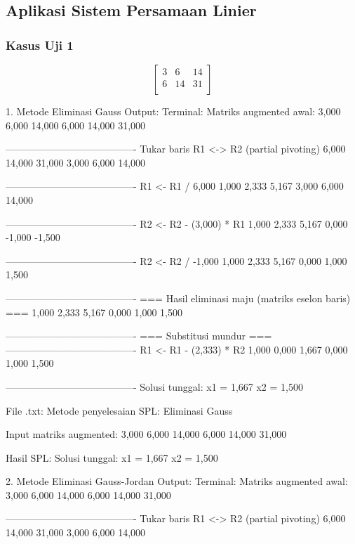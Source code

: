 \documentclass[12pt]{article}
\begin{document}
\begin{enumerate}
\subsection{Aplikasi Sistem Persamaan Linier}
\subsubsection{Kasus Uji 1}
\begin{equation}
    \begin{bmatrix}
        3 & 6 & 14 \\
        6 & 14 & 31 \\
    \end{bmatrix}
\end{equation}
\begin{keluaran}
1. Metode Eliminasi Gauss
Output:
Terminal:
Matriks augmented awal:
3,000   6,000   14,000
6,000   14,000  31,000

----------------------------------------
Tukar baris R1 <-> R2 (partial pivoting)
6,000   14,000  31,000
3,000   6,000   14,000

----------------------------------------
R1 <- R1 / 6,000
1,000   2,333   5,167
3,000   6,000   14,000

----------------------------------------
R2 <- R2 - (3,000) * R1
1,000   2,333   5,167
0,000   -1,000  -1,500

----------------------------------------
R2 <- R2 / -1,000
1,000   2,333   5,167
0,000   1,000   1,500

----------------------------------------
=== Hasil eliminasi maju (matriks eselon baris) ===
1,000   2,333   5,167
0,000   1,000   1,500

----------------------------------------
=== Substitusi mundur ===
----------------------------------------
R1 <- R1 - (2,333) * R2
1,000   0,000   1,667
0,000   1,000   1,500

----------------------------------------
Solusi tunggal:
x1 = 1,667
x2 = 1,500

File .txt:
Metode penyelesaian SPL: Eliminasi Gauss

Input matriks augmented:
3,000	6,000	14,000
6,000	14,000	31,000

Hasil SPL:
Solusi tunggal:
x1 = 1,667
x2 = 1,500

2. Metode Eliminasi Gauss-Jordan
Output:
Terminal:
Matriks augmented awal:
3,000   6,000   14,000
6,000   14,000  31,000

----------------------------------------
Tukar baris R1 <-> R2 (partial pivoting)
6,000   14,000  31,000
3,000   6,000   14,000


\end{keluaran}
\end{enumerate}
\end{document}
